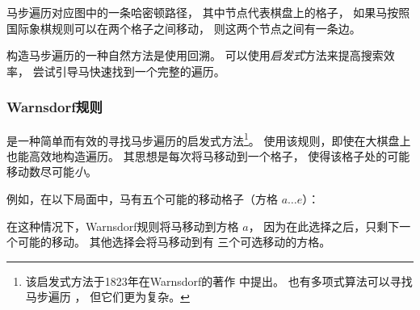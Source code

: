 马步遍历对应图中的一条哈密顿路径，
其中节点代表棋盘上的格子，
如果马按照国际象棋规则可以在两个格子之间移动，
则这两个节点之间有一条边。

构造马步遍历的一种自然方法是使用回溯。
可以使用\emph{启发式}方法来提高搜索效率，
尝试引导马快速找到一个完整的遍历。

\subsubsection{Warnsdorf规则}


是一种简单而有效的寻找马步遍历的启发式方法\footnote{该启发式方法于1823年在Warnsdorf的著作 \cite{war23} 中提出。
也有多项式算法可以寻找马步遍历 \cite{par97}，
但它们更为复杂。}。
使用该规则，即使在大棋盘上也能高效地构造遍历。
其思想是每次将马移动到一个格子，
使得该格子处的可能移动数尽可能\emph{小}。

例如，在以下局面中，马有五个可能的移动格子（方格 $a \ldots e$）：
\begin{center}
\end{center}
在这种情况下，Warnsdorf规则将马移动到方格 $a$，
因为在此选择之后，只剩下一个可能的移动。
其他选择会将马移动到有
三个可选移动的方格。


